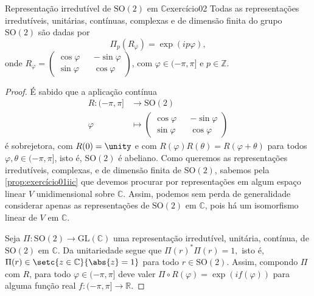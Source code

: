 \begin{example}{Representação irredutível de \(\mathrm{SO}(2)\) em \(\mathbb{C}\)}{exercício02}
    Todas as representações irredutíveis, unitárias, contínuas, complexas e de dimensão finita do grupo \(\mathrm{SO}(2)\) são dadas por
    \begin{equation*}
        \Pi_p(R_\varphi) = \exp(i p \varphi),
    \end{equation*}
    onde \(R_\varphi = \left(\begin{smallmatrix}
            \cos\varphi &&- \sin \varphi\\
            \sin\varphi && \cos\varphi
    \end{smallmatrix}\right)\), com \(\varphi \in (-\pi, \pi]\) e \(p \in \mathbb{Z}\).
\end{example}
\begin{proof}
    É sabido que a aplicação contínua
    \begin{align*}
        R : (-\pi, \pi] &\to \mathrm{SO}(2)\\
                \varphi &\mapsto \begin{pmatrix}
            \cos\varphi &&- \sin \varphi\\
            \sin\varphi && \cos\varphi
    \end{pmatrix}
    \end{align*}
    é sobrejetora, com \(R(0) = \unity\) e com \(R(\varphi)R(\theta) = R(\varphi + \theta)\) para todos \(\varphi,\theta \in (-\pi, \pi]\), isto é, \(\mathrm{SO}(2)\) é abeliano. Como queremos as representações irredutíveis, complexas, e de dimensão finita de \(\mathrm{SO}(2)\), sabemos pela \cref{prop:exercício01iic} que devemos procurar por representações em algum espaço linear \(V\) unidimensional sobre \(\mathbb{C}\). Assim, podemos sem perda de generalidade considerar apenas as representações de \(\mathrm{SO}(2)\) em \(\mathbb{C}\), pois há um isomorfismo linear de \(V\) em \(\mathbb{C}\).

    Seja \(\Pi : \mathrm{SO}(2) \to \mathrm{GL}(\mathbb{C})\) uma representação irredutível, unitária, contínua, de \(\mathrm{SO}(2)\) em \(\mathbb{C}\). Da unitariedade segue que \(\Pi(r)^*\Pi(r) = 1,\) isto é, \(\Pi(r) \in \setc{z \in \mathbb{C}}{\abs{z} = 1}\) para todo \(r \in \mathrm{SO}(2)\). Assim, compondo \(\Pi\) com \(R\), para todo \(\varphi \in (-\pi, \pi]\) deve valer \(\Pi \circ R(\varphi) = \exp(i f(\varphi))\) para alguma função real \(f : (-\pi,\pi] \to \mathbb{R}\).


\end{proof}
